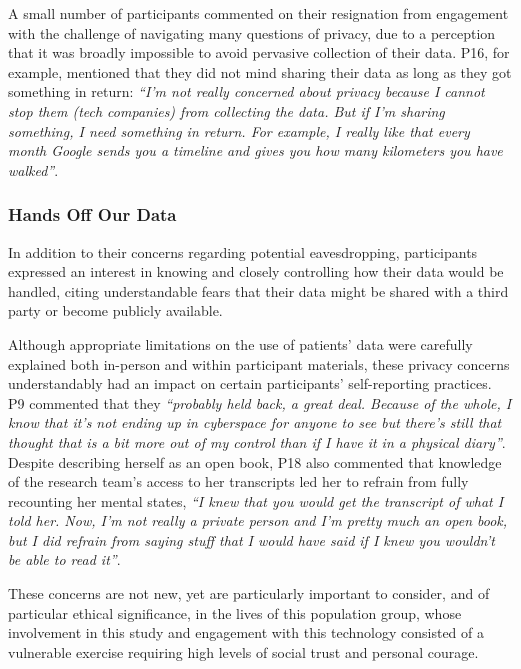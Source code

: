             A small number of participants commented on their resignation from engagement with the challenge of navigating many questions of privacy, due to a perception that it was broadly impossible to avoid pervasive collection of their data. P16, for example, mentioned that they did not mind sharing their data as long as they got something in return: \textit{``I'm not really concerned about privacy because I cannot stop them (tech companies) from collecting the data. But if I'm sharing something, I need something in return. For example, I really like that every month Google sends you  a timeline and gives you how many kilometers you have walked''}.
            
        \subsubsection{Hands Off Our Data} %
            
            In addition to their concerns regarding potential eavesdropping, participants expressed an interest in knowing and closely controlling how their data would be handled, citing understandable fears that their data might be shared with a third party or become publicly available. 
            
            Although appropriate limitations on the use of patients' data were carefully explained both in-person and within participant materials, these privacy concerns understandably had an impact on certain participants' self-reporting practices. P9 commented that they \textit{``probably held back, a great deal. Because of the whole, I know that it's not ending up in cyberspace for anyone to see but there's still that thought that is a bit more out of my control than if I have it in a physical diary''}. Despite describing herself as an open book, P18 also commented that knowledge of the research team's access to her transcripts led her to refrain from fully recounting her mental states, \textit{``I knew that you would get the transcript of what I told her. Now, I'm not really a private person and I'm pretty much an open book, but I did refrain from saying stuff that I would have said if I knew you wouldn't be able to read it''}.
                      
            These concerns are not new, yet are particularly important to consider, and of particular ethical significance, in the lives of this population group, whose involvement in this study and engagement with this technology consisted of a vulnerable exercise requiring high levels of social trust and personal courage. 
        
